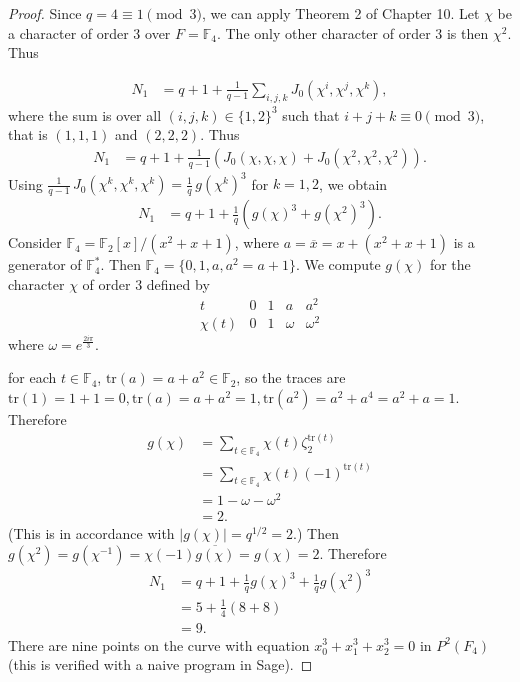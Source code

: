 \documentclass[11pt,a4paper]{article}
\newcommand{\F}{\mathbb{F}}
\begin{document}
\begin{proof}
Since $q=4 \equiv 1 \pmod 3$, we can apply Theorem 2 of Chapter 10. Let $\chi$ be a character of order 3 over $F=\F_4$. The only other character of order $3$ is then $\chi^2$. Thus

\begin{align*}
N_1 &= q+1 + \frac{1}{q-1}  \sum_{i,j,k} J_0(\chi^i,\chi^j,\chi^k),
\end{align*}
where the sum is over all $(i,j,k) \in \{1,2\}^3$ such that $i+j+k \equiv 0 \pmod 3$, that is $(1,1,1)$ and $(2,2,2)$. Thus
\begin{align*}
N_1& = q +1 + \frac{1}{q-1} \left(J_0(\chi,\chi,\chi) + J_0(\chi^2,\chi^2,\chi^2)\right).
\end{align*}
Using $\frac{1}{q-1}\,  J_0(\chi^k,\chi^k,\chi^k) = \frac{1}{q}\, g(\chi^k)^3$ for $k=1,2$, we obtain
\begin{align*}
N_1&=q +1 + \frac{1}{q}\left ( g(\chi)^3 + g(\chi^2)^3\right).
\end{align*}
Consider $\F_4 = \F_2[x]/(x^2+x+1)$, where $a = \overline{x} = x + (x^2+x+1)$ is a generator of $\F_4^*$. Then  $\F_4 = \{0,1,a,a^2 = a+1\}$.
We compute $g(\chi)$ for the character $\chi$ of order $3$ defined by
$$
\begin{array}{c|cccc|}
t & 0 & 1 & a & a^2\\
\hline
\chi(t) & 0 & 1 & \omega & \omega^2
\end{array}
$$
where $\omega = e^\frac{2i\pi}{3}$. 

for each $t\in \F_4$, $\mathrm{tr}(a) = a+ a^2 \in \F_2$, so the traces are $\mathrm{tr}(1) = 1 + 1 = 0, \mathrm{tr}(a) = a+a^2 = 1, \mathrm{tr}(a^2) = a^2 + a^4 = a^2 + a = 1$. Therefore
\begin{align*}
g(\chi) &= \sum_{t \in \F_4} \chi(t) \zeta_2^{\mathrm{tr}(t)}\\
&= \sum_{t \in \F_4} \chi(t) (-1)^{\mathrm{tr}(t)}\\
&= 1 - \omega - \omega^2\\
&= 2.
\end{align*}
(This is in accordance with $|g(\chi)| = q^{1/2} = 2$.)
Then $g(\chi^2) = g(\chi^{-1}) = \chi(-1) \overline{g(\chi)} = g(\chi) = 2$. Therefore
\begin{align*}
N_1 &= q +1 + \frac{1}{q} g(\chi)^3 + \frac{1}{q} g(\chi^2)^3\\
&= 5 + \frac{1}{4}( 8 + 8)\\
&= 9.
\end{align*} 
There are nine points on the curve with equation $x_0^3 + x_1^3 + x_2^3 = 0$ in $P^2(F_4)$ (this is verified with a naive program in Sage).


\end{proof}
\end{document}
